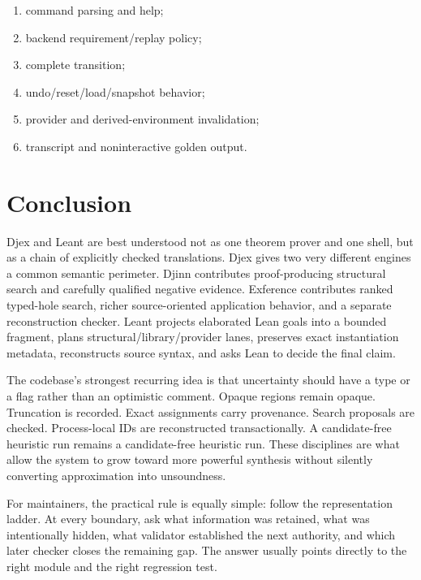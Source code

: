 \documentclass[10pt,letterpaper,oneside]{report}
\newcommand{\code}[1]{\texttt{\detokenize{#1}}}
\begin{document}
\begin{enumerate}
  \item command parsing and help;
  \item backend requirement/replay policy;
  \item complete \code{ReplState} transition;
  \item undo/reset/load/snapshot behavior;
  \item provider and derived-environment invalidation;
  \item transcript and noninteractive golden output.
\end{enumerate}

\chapter*{Conclusion}

Djex and Leant are best understood not as one theorem prover and one shell, but as a chain of explicitly checked translations. Djex gives two very different engines a common semantic perimeter. Djinn contributes proof-producing structural search and carefully qualified negative evidence. Exference contributes ranked typed-hole search, richer source-oriented application behavior, and a separate reconstruction checker. Leant projects elaborated Lean goals into a bounded fragment, plans structural/library/provider lanes, preserves exact instantiation metadata, reconstructs source syntax, and asks Lean to decide the final claim.

The codebase's strongest recurring idea is that uncertainty should have a type or a flag rather than an optimistic comment. Opaque regions remain opaque. Truncation is recorded. Exact assignments carry provenance. Search proposals are checked. Process-local IDs are reconstructed transactionally. A candidate-free heuristic run remains a candidate-free heuristic run. These disciplines are what allow the system to grow toward more powerful synthesis without silently converting approximation into unsoundness.

For maintainers, the practical rule is equally simple: follow the representation ladder. At every boundary, ask what information was retained, what was intentionally hidden, what validator established the next authority, and which later checker closes the remaining gap. The answer usually points directly to the right module and the right regression test.
\end{document}
